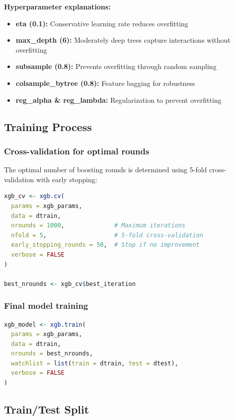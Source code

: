 \documentclass{article}
\begin{document}
\textbf{Hyperparameter explanations:}
\begin{itemize}
    \item \textbf{eta (0.1):} Conservative learning rate reduces overfitting
    \item \textbf{max\_depth (6):} Moderately deep trees capture interactions without overfitting
    \item \textbf{subsample (0.8):} Prevents overfitting through random sampling
    \item \textbf{colsample\_bytree (0.8):} Feature bagging for robustness
    \item \textbf{reg\_alpha \& reg\_lambda:} Regularization to prevent overfitting
\end{itemize}

\subsection{Training Process}

\subsubsection{Cross-validation for optimal rounds}

The optimal number of boosting rounds is determined using 5-fold cross-validation with early stopping:

\begin{lstlisting}[language=R]
xgb_cv <- xgb.cv(
  params = xgb_params,
  data = dtrain,
  nrounds = 1000,              # Maximum iterations
  nfold = 5,                   # 5-fold cross-validation
  early_stopping_rounds = 50,  # Stop if no improvement
  verbose = FALSE
)

best_nrounds <- xgb_cv$best_iteration
\end{lstlisting}

\subsubsection{Final model training}

\begin{lstlisting}[language=R]
xgb_model <- xgb.train(
  params = xgb_params,
  data = dtrain,
  nrounds = best_nrounds,
  watchlist = list(train = dtrain, test = dtest),
  verbose = FALSE
)
\end{lstlisting}

\subsection{Train/Test Split}
\end{document}
